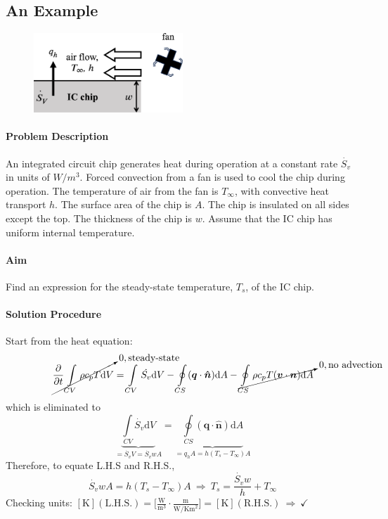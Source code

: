 \documentclass[12pt, a4paper]{article}
\begin{document}
\subsection{An Example}
\begin{tcolorbox}[breakable, title = Example: Cooling of a Circuit Board]
\begin{figure}[H]
    \centering
    \includegraphics[width=0.5\textwidth]{img/cooling_fan.eps}
\end{figure}
\paragraph{Problem Description} An integrated circuit chip generates heat during operation at a constant rate $\dot{S_{v}}$ in units of $W/m^{3}$. Forced convection from a fan is used to cool the chip during operation. The temperature of air from the fan is $T_{\infty}$, with convective heat transport $h$. The surface area of the chip is $A$. The chip is insulated on all sides except the top. The thickness of the chip is $w$. Assume that the IC chip has uniform internal temperature.

\paragraph{Aim} Find an expression for the steady-state temperature, $T_s$, of the IC chip.
\paragraph{Solution Procedure} Start from the heat equation:
\[ 
    \cancelto{0, \text{steady-state}}{\frac{\partial}{\partial t} \int\limits_{CV} \rho c_{p} T \mathrm{d}V} = \int\limits_{CV} \dot{S_{v}} \mathrm{d}V - \oint\limits_{CS} (\bm{q} \cdot \bm{\hat{n}}) \mathrm{d}A - \cancelto{0,\text{no advection}}{\oint\limits_{CS} \rho c_{p} T (\bm{v} \cdot \bm{n}) \mathrm{d}A}
\]
which is eliminated to
\[ 
    \underbrace{\int\limits_{CV} \dot{S_{v}} \mathrm{d}V}_{= \dot{S_{v}} V = \dot{S_{v}} w A}
    = \underbrace{\oint\limits_{CS} (\bm{q} \cdot \bm{\hat{n}}) \mathrm{d}A}_{= q_{h} A = h(T_{s}-T_{\infty}) A}
\]
Therefore, to equate L.H.S and R.H.S.,
\[ 
    \dot{S_{v}} w A = h(T_{s}-T_{\infty}) A \ \Rightarrow \  \boxed{T_{s} = \frac{\dot{S_{v}} w}{h}+T_{\infty}} 
\]
Checking units: 
$[\mathrm{K}] (\text{L.H.S.}) = \bigg[ \frac{\mathrm{W}}{\mathrm{m}^{3}} \cdot \frac{\mathrm{m}}{\mathrm{W}/\mathrm{Km}^{2}} \bigg] = [\mathrm{K}] (\text{R.H.S.}) \ \Rightarrow \ \checkmark$
\end{tcolorbox}
\end{document}
